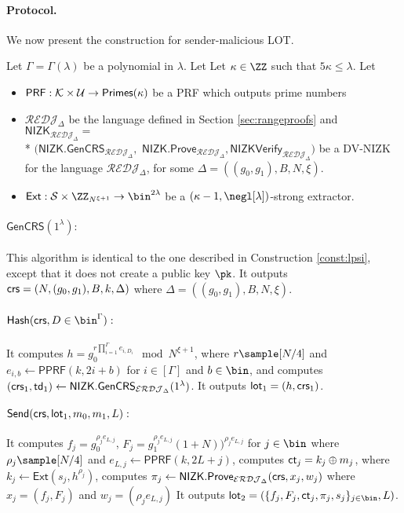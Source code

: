 \paragraph{Protocol.} We now present the construction for sender-malicious LOT.

\begin{construction}
\label{cons:lot}
Let $\Gamma=\Gamma(\lambda)$ be a polynomial in $\lambda$. Let 
Let $\kappa\in\ZZ$ such that $5\kappa\leq \lambda$. Let
\begin{itemize}
    \item $\mathsf{PRF}:\mathcal{K}\times \mathcal{U}\to \mathsf{Primes}(\kappa)$ be a PRF which outputs prime numbers
    \item $\mathcal{REDJ}_{\Delta}$ be the language defined in Section \ref{sec:rangeproofs} and   $\mathsf{NIZK}_{\mathcal{REDJ}_{\Delta}}=$\\* $(\mathsf{NIZK.GenCRS}_{\mathcal{REDJ}_{\Delta}},$ $\mathsf{NIZK.Prove}_{\mathcal{REDJ}_{\Delta}},\mathsf{NIZKVerify}_{\mathcal{REDJ}_{\Delta}})$ be a DV-NIZK for the language $\mathcal{REDJ}_{\Delta}$,  for some $\Delta=((g_0,g_1),B,N,\xi)$. 
    \item $\mathsf{Ext}:\Sc\times \ZZ_{N^{\xi+1}}\to\bin^{2\lambda}$ be a $(\kappa-1,\negl[\lambda])$-strong extractor.
\end{itemize}


\paragraph{$\mathsf{GenCRS}(1^\lambda):$}
This algorithm is identical to the one described in Construction \ref{const:lpsi}, except that it does not create a public key $\pk$. It outputs $\mathsf{crs}=(N,(g_0,g_1),B,k,\Delta)$ where $\Delta=((g_0,g_1),B,N,\xi)$. 
\paragraph{$\mathsf{Hash}(\crs,D\in\bin^\Gamma):$}
It computes $h=g_0^{r\prod_{i=1}^{\Gamma} e_{i,D_i}}\mod N^{\xi+1}$, where $r\sample [N/4]$ and $e_{i,b}\leftarrow\mathsf{PPRF}(k,2i+b)$ for $i\in[\Gamma]$ and $b\in\bin$, and computes $(\mathsf{crs}_1,\mathsf{td}_1)\leftarrow\mathsf{NIZK.GenCRS}_{\mathcal{ERDJ}_\Delta}(1^\lambda)$. It outputs $\mathsf{lot}_1=(h,\mathsf{crs}_1)$.

\paragraph{$\mathsf{Send}(\mathsf{crs},\mathsf{lot}_1,m_0,m_1,L):$}
It computes $f_j=g_0^{\rho_j e_{L,j}}$, $F_j=g_1^{\rho_j e_{L,j}}(1+N))^{\rho_j e_{L,j}}$ for $j\in\bin$ where $\rho_j\sample [N/4]$ and $e_{L,j}\leftarrow\mathsf{PPRF}(k,2L+j)$, computes $\mathsf{ct}_j=k_j\oplus m_j $, where $k_j\leftarrow\mathsf{Ext}(s_j,h^{\rho_j})$, computes $\pi_j\gets\mathsf{NIZK.Prove}_{\mathcal{ERDJ}_\Delta}(\mathsf{crs}, x_j,w_j)$ where $x_j=(f_j,F_j)$ and $w_j=(\rho_j e_{L,j})$ It outputs $\mathsf{lot}_2=(\{f_{j},F_j,\ct_j,\pi_j,s_j\}_{j\in\bin},L)$.


\end{construction}
